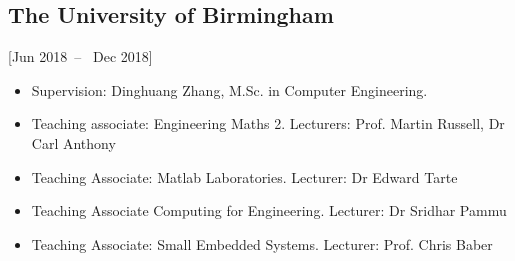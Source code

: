 \documentclass{mycv}
\begin{document}




\subsection{The University of Birmingham}[Jun 2018~--~ Dec 2018]


\begin{itemize}
\item Supervision: Dinghuang Zhang, M.Sc. in Computer Engineering.  %
\item Teaching associate: Engineering Maths 2. Lecturers: Prof. Martin Russell, Dr Carl Anthony 
\item Teaching Associate: Matlab Laboratories. Lecturer: Dr Edward Tarte  
\item Teaching Associate Computing for Engineering. Lecturer: Dr Sridhar Pammu  
\item Teaching Associate: Small Embedded Systems. Lecturer: Prof. Chris Baber   
\end{itemize}
\end{document}
